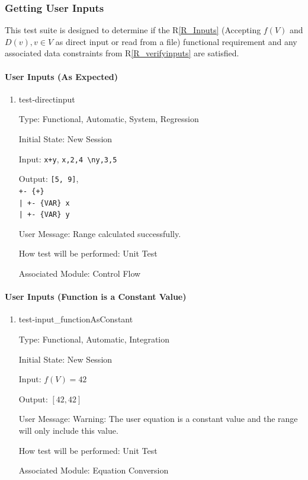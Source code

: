 \documentclass[12pt, titlepage]{article}
\newcommand{\rref}[1]{R\ref{#1}}
\begin{document}
\subsubsection{Getting User Inputs}
\label{tests_gettingInputs}
This test suite is designed to determine if the \rref{R_Inputs} (Accepting 
$f(V)$ and $D(v), v \in V$ as direct input or read from a file) functional 
requirement and any associated data constraints from 
\rref{R_verifyinputs} are satisfied.

\paragraph{User Inputs (As Expected)}

\begin{enumerate}
	
	\item{test-directinput}
	
	Type: Functional, Automatic, System, Regression
		
	Initial State: New Session
		
	Input: \texttt{x+y}, \texttt{x,2,4 \textbackslash ny,3,5}
		
	Output: \texttt{[5, 9]}, \\
	\texttt{+- \{+\}\\
		|     +- \{VAR\} x\\
		|     +- \{VAR\} y}
		
	User Message: Range calculated successfully.
		
	How test will be performed: Unit Test
		
	Associated Module: Control Flow\\

\end{enumerate}
	
\paragraph{User Inputs (Function is a Constant Value)}

\begin{enumerate}	
	\item{test-input\_functionAsConstant}
	
	Type: Functional, Automatic, Integration
	
	Initial State: New Session
	
	Input: $f(V) = 42$
	
	Output:	$[42,42]$
	
	User Message: Warning: The user equation is a constant value and the range 
	will only include this value.
	
	How test will be performed: Unit Test
	
	Associated Module: Equation Conversion\\
\end{enumerate}
	
\end{document}
